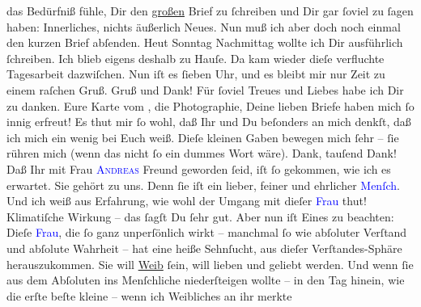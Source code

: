                das Bedürfniß {\pb}fühle, Dir den \uline{großen} Brief zu ſchreiben und Dir gar ſoviel zu ſagen haben:
               Innerliches, nichts äußerlich Neues. Nun muß ich aber doch  noch einmal den kurzen Brief abſenden. Heut Sonntag{ }Nachmittag wollte ich Dir ausführlich ſchreiben. Ich blieb eigens
               deshalb zu Hauſe. Da kam wieder dieſe verfluchte Tagesarbeit dazwiſchen. Nun iſt es
                  ſieben Uhr, und es bleibt mir nur Zeit zu einem {\pb}raſchen Gruß.\pend
           \pstart
           Gruß und Dank! Für ſoviel Treues und Liebes habe ich Dir zu danken. Eure Karte vom
                  \label{K_L02735-1v}\label{K_L02735-1h}, die
               Photographie, Deine lieben Briefe haben mich ſo innig erfreut! Es thut mir ſo wohl,
               daß Ihr und Du beſonders an mich denkſt, daß ich mich ein wenig bei Euch weiß. Dieſe
               kleinen Gaben bewegen mich ſehr – ſie rühren mich (wenn das nicht {\pb}ſo ein dummes Wort wäre). Dank, tauſend Dank!\pend
           \pstart
           Daß Ihr mit Frau \textsc{\textcolor{blue}{Andreas}{}\ledrightnote{\textcolor{blue}{Lou Andreas-Salomé}}} Freund geworden ſeid, iſt ſo gekommen, wie ich es erwartet. Sie gehört zu uns.
               Denn ſie iſt ein lieber, feiner und ehrlicher \textcolor{blue}{Menſch}{}. Und ich weiß aus Erfahrung, wie wohl der Umgang mit
               dieſer \textcolor{blue}{Frau}{} thut!
               Klimatiſche Wirkung – das ſagſt Du ſehr gut. Aber nun iſt Eines zu beachten: {\pb}Dieſe \textcolor{blue}{Frau}{}, die ſo ganz unperſönlich wirkt – manchmal ſo wie
               abſoluter Verſtand und abſolute Wahrheit – hat eine heiße Sehnſucht, aus dieſer
               Verſtandes-Sphäre herauszukommen. Sie will \uline{Weib} ſein,
               will lieben und geliebt werden. Und wenn ſie aus dem Abſoluten ins Menſchliche
               niederſteigen wollte – in den Tag hinein, wie  die
               erſte beſte kleine {\pb}\label{K_L02735-55v}\label{K_L02735-55h} – wenn ich Weibliches an ihr merkte
